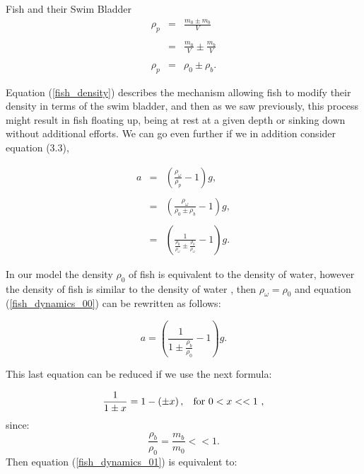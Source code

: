 \begin{section}{Fish and their Swim Bladder}
    \begin{eqnarray}
        \rho_p &=& \frac{m_0 \pm m_b}{V}
        \nonumber\\
        {}&{}&{} \nonumber \\
        &=& \frac{m_0}{V} \pm \frac{m_b}{V}
         \nonumber\\
        {}&{}&{} \nonumber \\
        \label{fish_density}
        \rho_p &=& \rho_0 \pm \rho_b.
    \end{eqnarray}
    
    Equation (\ref{fish_density}) describes the mechanism allowing fish to modify their density in
    terms of the swim bladder, and then as we saw previously, this process might result in fish 
    floating up, being at rest at a given depth or sinking down without additional efforts. We can go 
    even further if we in addition consider equation (3.3),
    
    \begin{eqnarray}
        a &=& \left( \frac{\rho_{\omega}}{\rho_p} -1 \right)g,
        \nonumber\\
        {}&{}&{}
        \nonumber \\
        &=& \left( \frac{\rho_{\omega}}{\rho_0 \pm \rho_b} -1 \right)g,
        \nonumber\\
        {}&{}&{}
        \nonumber \\
        \label{fish_dynamics_00}
        &=& \left( \frac{1}{\frac{\rho_0}{\rho_{\omega}} \pm \frac{\rho_b}{\rho_{\omega}}} -1 \right)g.
    \end{eqnarray}
    
    In our model the density $\rho_0$ of fish is equivalent to the density of water, however the density
    of fish is similar to the density of water \cite{QUENTIN}, then $\rho_{\omega} = \rho_0$ and equation 
    (\ref{fish_dynamics_00}) can be rewritten as follows:
    
    \begin{equation}
        \label{fish_dynamics_01}
        a = \left( \frac{1}{ 1 \pm \frac{\rho_b}{\rho_0}} - 1 \right)g.
    \end{equation}
    
    This last equation can be reduced if we use the next formula:
    
    \begin{equation}
        \label{formula}
        \frac{1}{1 \pm x} = 1 - \left(\pm x\right), \hspace{3mm} \text{for  $0<x<<1$ },
    \end{equation}
    since: $$\frac{\rho_b}{\rho_0} = \frac{m_b}{m_0} << 1. $$ Then equation (\ref{fish_dynamics_01})
    is equivalent to:
    

\end{section}
